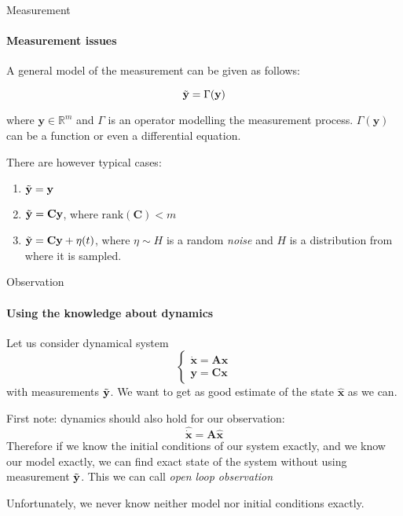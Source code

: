 \documentclass{beamer}
\begin{document}
\begin{frame}{Measurement}
\framesubtitle{Measurement issues}
\begin{flushleft}

A general model of the measurement can be given as follows:

\[
\Tilde{\mathbf y} = \Gamma(\mathbf y)
\]

where $\mathbf y \in \mathbb{R}^m$ and $\Gamma$ is an operator modelling the measurement process. $\Gamma(\mathbf y)$ can be a function or even a differential equation.

There are however typical cases:

\begin{enumerate}
\item $\Tilde{\mathbf y} = \mathbf y$
\item $\Tilde{\mathbf y} = \mathbf C \mathbf y$, where $\text{rank} (\mathbf C) < m$
\item $\Tilde{\mathbf y} = \mathbf C \mathbf y + \eta(t)$, where $\eta \sim H$ is a random \emph{noise} and $H$ is a distribution from where it is sampled.
\end{enumerate}

\end{flushleft}
\end{frame}

\begin{frame}{Observation}
\framesubtitle{Using the knowledge about dynamics}
\begin{flushleft}

Let us consider dynamical system
\[
\begin{cases}
\dot {\mathbf x} = \mathbf A \mathbf x\\
\mathbf y = \mathbf C \mathbf x
\end{cases}
\]
%
with measurements $\Tilde{\mathbf y}$. We want to get as good estimate of the state $\hat{\mathbf x}$ as we can.

\bigskip

First note: dynamics should also hold for our observation:
\[
\hat{\dot {\mathbf x}} = \mathbf A \hat{\mathbf x} 
\]
%
Therefore if we know the initial conditions of our system exactly, and we know our model exactly, we can find exact state of the system without using measurement $\Tilde{\mathbf y}$. This we can call \emph{open loop observation}

Unfortunately, we never know neither model nor initial conditions exactly.


\end{flushleft}
\end{frame}
\end{document}
